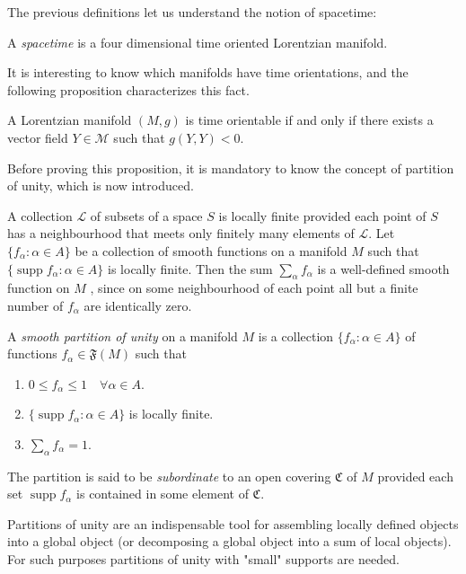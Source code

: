 The previous definitions let us understand the notion of spacetime:

\begin{definition}[Spacetime]
	A \emph{spacetime} is a four dimensional time oriented Lorentzian manifold.
\end{definition}

It is interesting to know which manifolds have time orientations, and the following proposition characterizes this fact.

\begin{proposition}
	\label{pro:timeorientable}
	A Lorentzian manifold $(M,g)$ is time orientable if and only if there exists a vector field $Y \in \mathcal{M}$ such that $g(Y,Y) < 0$.
\end{proposition}

Before proving this proposition, it is mandatory to know the concept of partition of unity, which is now introduced.

A collection $\mathcal{L}$ of subsets of a space $S$ is locally finite provided each point of $S$ has a neighbourhood that meets only finitely many elements of $\mathcal{L}$. Let $\{f_\alpha \colon \alpha \in A\}$ be a collection of smooth functions on a manifold $M$ such that $\{\operatorname{supp} f_\alpha \colon \alpha \in A\}$ is locally finite. Then the sum $\sum_\alpha f_\alpha$ is a well-defined smooth function on $M$ , since on some neighbourhood of each point all but a finite number of $f_\alpha$ are identically zero.

\begin{definition}
	A \emph{smooth partition of unity} on a manifold $M$ is a collection $\{f_\alpha \colon \alpha \in A\}$ of functions $f_\alpha \in \mathfrak{F}(M)$ such that
	\begin{enumerate}
		\item $0 \leq f_\alpha \leq 1 \quad \forall \alpha \in A$.
		\item $\{\operatorname{supp} f_\alpha \colon \alpha \in A\}$ is locally finite.
		\item $\sum_\alpha f_\alpha = 1$.
	\end{enumerate}
	
	The partition is said to be \emph{subordinate} to an open covering $\mathfrak{C}$ of $M$ provided each set $\operatorname{supp} f_\alpha$ is contained in some element of $\mathfrak{C}$.
\end{definition}

Partitions of unity are an indispensable tool for assembling locally defined  objects into a global object (or decomposing a global object into a sum of local objects). For such purposes  partitions of unity with "small" supports are needed.

